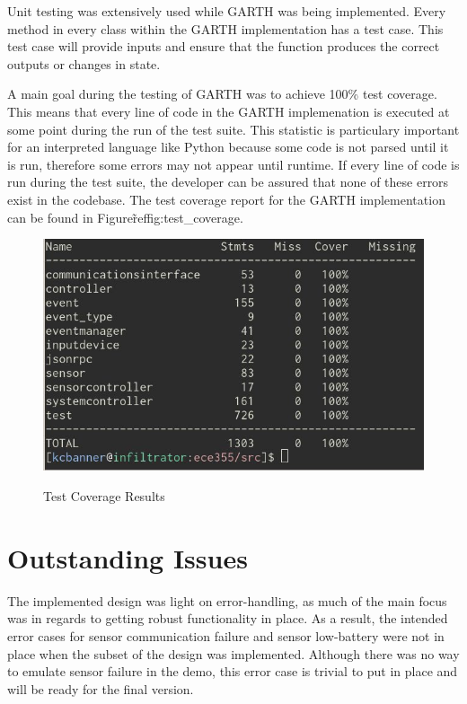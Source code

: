 \documentclass{article}
\begin{document}
Unit testing was extensively used while GARTH was being
implemented. Every method in every class within the GARTH
implementation has a test case. This test case will provide inputs and
ensure that the function produces the correct outputs or changes in
state. 

A main goal during the testing of GARTH was to achieve 100\% test
coverage. This means that every line of code in the GARTH
implemenation is executed at some point during the run of the test
suite. This statistic is particulary important for an interpreted
language like Python because some code is not parsed until it is run,
therefore some errors may not appear until runtime. If every line of
code is run during the test suite, the developer can be assured that
none of these errors exist in the codebase. The test coverage report
for the GARTH implementation can be found in Figure\~ref{fig:test\_coverage}.

\begin{figure}[hp]
    \centering
        \caption{Test Coverage Results}
        \scriptsize
        \setlength{\unitlength}{2.0em}
        \includegraphics[scale=0.5]{test_coverage.png}
        \normalsize
    \label{fig:test_coverage}
\end{figure}


\section{Outstanding Issues} %

The implemented design was light on error-handling, as much of the
main focus was in regards to getting robust functionality in place. As
a result, the intended error cases for sensor communication failure
and sensor low-battery were not in place when the subset of the design
was implemented. Although there was no way to emulate sensor failure
in the demo, this error case is trivial to put in place and will be
ready for the final version.
\end{document}
